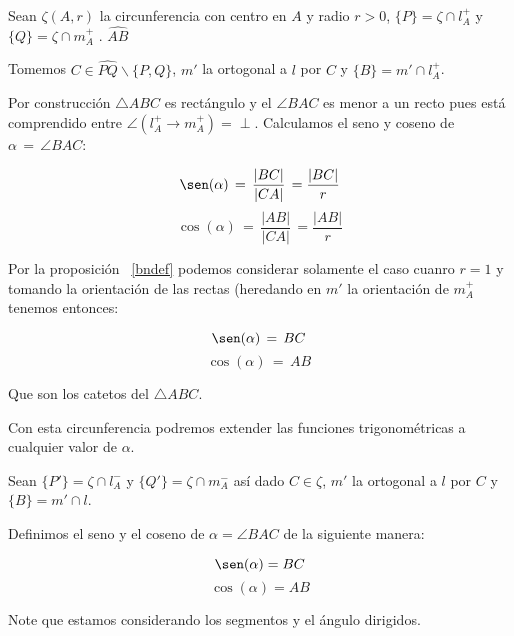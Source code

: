 Sean $\zeta(A,r)$ la circunferencia con centro en $A$ y radio $r>0$, $\{P\}=\zeta \cap l_{A}^{+}$ y $\{Q\}=\zeta \cap m_{A}^{+}$ . $\widehat{AB}$

Tomemos  $C \in\widehat{PQ}\backslash \{P,Q\} $, $m'$ la ortogonal a $l$ por $C$ y $\{B\} = m' \cap l_A^{+}$.

Por construcción $\triangle ABC$ es rectángulo y el $\angle BAC$ es menor a un recto pues está comprendido entre $\angle (l_{A}^{+} \rightarrow m_{A}^{+}) = \perp$.
Calculamos el seno y coseno de $\alpha\,=\, \angle BAC$:

\[\sen(\alpha)\,=\,\frac{|BC|}{|CA|}\,=\frac{|BC|}{r}\]
\[\cos(\alpha)\,=\,\frac{|AB|}{|CA|}\,=\frac{|AB|}{r}\]

Por la proposición ~\ref{bndef} podemos considerar solamente el caso cuanro $r=1$ y tomando la orientación de las rectas (heredando en $m'$ la orientación de $m_{A}^{+}$ tenemos entonces:
             
\[\sen(\alpha)\,=\,BC\,\]
\[\cos(\alpha)\,=\,AB\,\]

Que son los catetos del $\triangle ABC$. 

Con esta circunferencia podremos extender las funciones trigonométricas a cualquier valor de $\alpha$.

Sean $\{P'\}=\zeta \cap l_{A}^{-}$ y $\{Q'\}=\zeta \cap m_{A}^{-}$ así dado $C \in \zeta$, $m'$ la ortogonal a $l$ por $C$ y $\{B\} = m' \cap l$.
\begin{df}Definimos el seno y el coseno de $\alpha=\angle BAC$ de la siguiente manera:
               
\[\sen(\alpha)=BC \]
\[\cos(\alpha)=AB \]
                      
Note que  estamos considerando los segmentos y el ángulo dirigidos.                      
\end{df}


